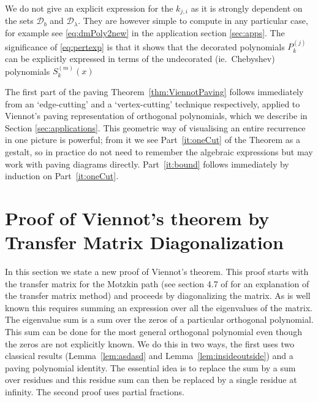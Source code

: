 \documentclass[11pt,a4paper]{article}
\begin{document}
We do not give an explicit expression  for the $k_{j,i}$ as it is strongly dependent on the sets $\mathcal{D}_b$ and $\mathcal{D}_\lambda$. They are however simple to compute in any particular case, for example see \eqref{eq:dmPoly2new} in the application section \ref{sec:apps}. The significance of \eqref{eq:pertexp} is that it shows that the decorated polynomials $P_k^{(j)}$ can be explicitly expressed in terms of the undecorated (ie.\ Chebyshev) polynomials $S_{k}^{(m)}(x)$

The first part of the paving Theorem~\ref{thm:ViennotPaving} follows immediately from an `edge-cutting' and a `vertex-cutting' technique respectively, applied to Viennot's paving representation of orthogonal polynomials, which we describe in  Section \ref{sec:applications}.  This geometric way of visualising an entire recurrence in one picture is powerful; from it we see Part~\ref{it:oneCut} of the Theorem as a gestalt, so in practice do not need to remember the algebraic expressions but may work with  paving diagrams directly.  Part~\ref{it:bound} follows immediately by induction on Part~\ref{it:oneCut}.



%
 
\section{Proof of Viennot's theorem by Transfer Matrix Diagonalization}	%
\label{sec_tmatrixPrrof}

In this section we state a new proof of Viennot's theorem.   This proof starts with the transfer matrix for the Motzkin path (see section 4.7 of \cite{stanley:1997vw} for an explanation of the transfer matrix method) and proceeds by diagonalizing the matrix. As is well known this requires summing an  expression over all the eigenvalues of the matrix. The eigenvalue sum is a sum over the zeros of a particular orthogonal polynomial. This sum can be done for the most general orthogonal polynomial even though the zeros are not  explicitly known.  We do this in two ways, the first uses two classical results (Lemma~\ref{lem:asdasd} and Lemma~\ref{lem:insideoutside}) and a paving polynomial identity. The essential idea is to replace the sum by a sum over residues and this residue sum can then be replaced by a single residue at infinity. The second proof uses partial fractions.  
\end{document}
